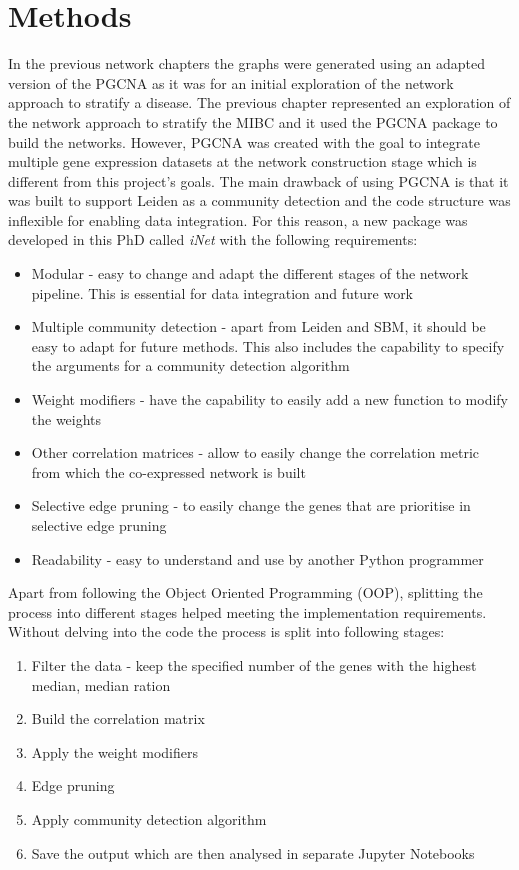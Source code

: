 \section{Methods} \label{s:N_II:methods}

In the previous network chapters the graphs were generated using an adapted version of the PGCNA as it was for an initial exploration of the network approach to stratify a disease. The previous chapter represented an exploration of the network approach to stratify the MIBC and it used the PGCNA package to build the networks. However, PGCNA was created with the goal to integrate multiple gene expression datasets at the network construction stage which is different from this project's goals. The main drawback of using PGCNA is that it was built to support Leiden as a community detection and the code structure was inflexible for enabling data integration. For this reason, a new package was developed in this PhD called \textit{iNet} with the following requirements: 

\begin{itemize}
    \item Modular - easy to change and adapt the different stages of the network pipeline. This  is essential for data integration and future work
    \item Multiple community detection - apart from Leiden and SBM, it should be easy to adapt for future methods. This also includes the capability to specify the arguments for a community detection algorithm
    \item Weight modifiers - have the capability to easily add a new function to modify the weights
    \item Other correlation matrices - allow to easily change the correlation metric from which the co-expressed network is built
    \item Selective edge pruning - to easily change the genes that are prioritise in selective edge pruning 
    \item Readability - easy to understand and use by another Python programmer
\end{itemize}

Apart from following the Object Oriented Programming (OOP), splitting the process into different stages helped meeting the implementation requirements. Without delving into the code the process is split into following stages:
\begin{enumerate}
    \item Filter the data - keep the specified number of the genes with the highest median, median ration
    \item Build the correlation matrix
    \item Apply the weight modifiers
    \item Edge pruning
    \item Apply community detection algorithm
    \item Save the output which are then analysed in separate Jupyter Notebooks
\end{enumerate}

